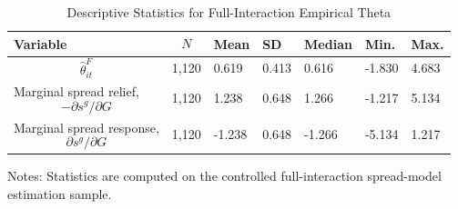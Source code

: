 \begin{table}[H]\centering
\begin{threeparttable}
\caption{Descriptive Statistics for Full-Interaction Empirical Theta}
\label{tab:theta_descriptive_stats}
\scriptsize
\begin{tabularx}{\textwidth}{lYYYYYY}
\toprule
Variable & $$N$$ & Mean & SD & Median & Min. & Max. \\
\midrule
$$\widehat{\theta}^{F}_{it}$$ & 1,120 & 0.619 & 0.413 & 0.616 & -1.830 & 4.683 \\
Marginal spread relief, $$-\partial s^g/\partial G$$ & 1,120 & 1.238 & 0.648 & 1.266 & -1.217 & 5.134 \\
Marginal spread response, $$\partial s^g/\partial G$$ & 1,120 & -1.238 & 0.648 & -1.266 & -5.134 & 1.217 \\
\bottomrule
\end{tabularx}
\begin{tablenotes}[flushleft]\footnotesize
\item Notes: Statistics are computed on the controlled full-interaction spread-model estimation sample.
\end{tablenotes}
\end{threeparttable}
\end{table}
